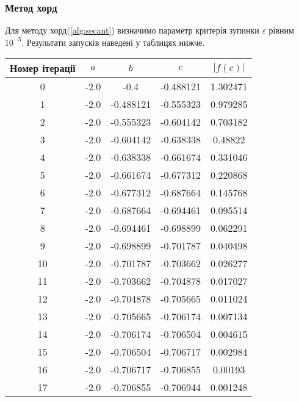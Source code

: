 \clearpage
\subsubsection*{Метод хорд}
Для методу хорд(\ref{alg:secant}) визначимо параметр критерія зупинки
$\varepsilon$ рівним $10^{-5}$.
Результати запусків наведені у таблицях нижче.

\begin{table}[h!]
    \centering
    \begin{tabular}{|c|c|c|c|c|}
        \hline
        \textbf{Номер ітерації} & $a$ & $b$ & $c$ & $|f(c)|$ \\
        \hline
        0 & -2.0 & -0.4 & -0.488121 & 1.302471 \\
        \hline
        1 & -2.0 & -0.488121 & -0.555323 & 0.979285 \\
        \hline
        2 & -2.0 & -0.555323 & -0.604142 & 0.703182 \\
        \hline
        3 & -2.0 & -0.604142 & -0.638338 & 0.48822 \\
        \hline
        4 & -2.0 & -0.638338 & -0.661674 & 0.331046 \\
        \hline
        5 & -2.0 & -0.661674 & -0.677312 & 0.220868 \\
        \hline
        6 & -2.0 & -0.677312 & -0.687664 & 0.145768 \\
        \hline
        7 & -2.0 & -0.687664 & -0.694461 & 0.095514 \\
        \hline
        8 & -2.0 & -0.694461 & -0.698899 & 0.062291 \\
        \hline
        9 & -2.0 & -0.698899 & -0.701787 & 0.040498 \\
        \hline
        10 & -2.0 & -0.701787 & -0.703662 & 0.026277 \\
        \hline
        11 & -2.0 & -0.703662 & -0.704878 & 0.017027 \\
        \hline
        12 & -2.0 & -0.704878 & -0.705665 & 0.011024 \\
        \hline
        13 & -2.0 & -0.705665 & -0.706174 & 0.007134 \\
        \hline
        14 & -2.0 & -0.706174 & -0.706504 & 0.004615 \\
        \hline
        15 & -2.0 & -0.706504 & -0.706717 & 0.002984 \\
        \hline
        16 & -2.0 & -0.706717 & -0.706855 & 0.00193 \\
        \hline
        17 & -2.0 & -0.706855 & -0.706944 & 0.001248 \\

\end{tabular}
\end{table}
